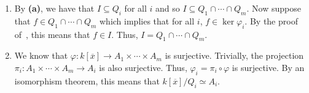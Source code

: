 \documentclass[letterpaper, 11pt, oneside]{book}
\begin{document}
\begin{sol}
\begin{enumerate}
    \item By \textbf{(a)}, we have that $I \subseteq Q_{i}$ for all $i$ and so $I \subseteq Q_{1} \cap \cdots \cap Q_{m}$.
          Now suppose that $f \in Q_{1} \cap \cdots \cap Q_{m}$ which implies that for all $i$, $f \in \ker \varphi_{i}$.
          By the proof of~\cite[\S 4.2, Theorem 2.2]{book:UAG}, this means that $f \in I$.
          Thus, $I = Q_{1} \cap \cdots \cap Q_{m}$.
    \item We know that $\varphi\colon k[\overline{x}] \to A_{1} \times \cdots \times A_{m}$ is surjective.
          Trivially, the projection $\pi_{i}\colon A_{1} \times \cdots \times A_{m} \to A_{i}$ is also surjective.
          Thus, $\varphi_{i} = \pi_{i} \circ \varphi$ is surjective.
          By an isomorphism theorem, this means that $k[\overline{x}] / Q_{i} \simeq A_{i}$.
  \end{enumerate}
\end{sol}

\printbibliography
\end{document}
